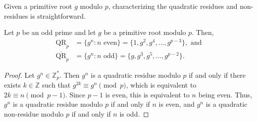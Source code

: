 Given a primitive root \(g\) modulo \(p\), characterizing the quadratic residues and non-residues is straightforward.

\begin{theorem}
    Let \(p\) be an odd prime and let \(g\) be a primitive root modulo \(p\). Then,
    \begin{align*}
        \operatorname{QR}_p &= \{g^{n} : n \text{ even}\} = \{1, g^2, g^4, \dots, g^{p-3}\}, \text{ and} \\
        \overline{\operatorname{QR}}_p &= \{g^{n} : n \text{ odd}\} = \{g, g^3, g^5, \dots, g^{p-2}\}.
    \end{align*}
\end{theorem}

\begin{proof}
    Let \(g^n \in \mathbb{Z}_p^*\).
    Then \(g^n\) is a quadratic residue modulo \(p\) if and only if there exists \(k \in \mathbb{Z}\) such that \(g^{2k} \equiv g^n \pmod{p}\), which is equivalent to \(2k \equiv n \pmod{p-1}\).
    Since \(p-1\) is even, this is equivalent to \(n\) being even.
    Thus, \(g^n\) is a quadratic residue modulo \(p\) if and only if \(n\) is even, and \(g^n\) is a quadratic non-residue modulo \(p\) if and only if \(n\) is odd.
\end{proof}
